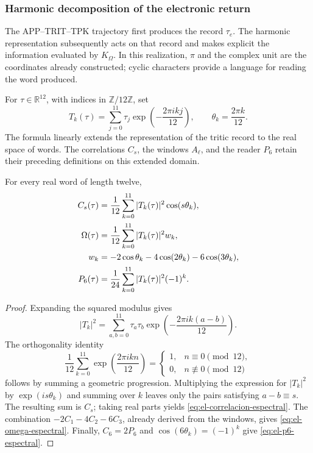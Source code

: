 \subsubsection{Harmonic decomposition of the electronic return}
\label{sec:el-espectro-retorno}

The APP--TRIT--TPK trajectory first produces the record
\(\tau_e\). The harmonic representation subsequently acts on that
record and makes explicit the information evaluated by \(K_\Omega\).
In this realization, \(\pi\) and the complex unit are the
coordinates already constructed; cyclic characters provide a
language for reading the word produced.

For \(\tau\in\mathbb R^{12}\), with indices in
\(\mathbb Z/12\mathbb Z\), set
\begin{equation}
 T_k(\tau)=\sum_{j=0}^{11}\tau_j
             \exp\!\left(-\frac{2\pi i kj}{12}\right),\qquad
 \theta_k=\frac{2\pi k}{12}.
 \label{eq:el-transformada-finita}
\end{equation}
The formula linearly extends the representation of the tritic
record to the real space of words. The correlations \(C_s\),
the windows \(A_\ell\), and the reader \(P_6\) retain their
preceding definitions on this extended domain.

\begin{theorem}
\label{thm:el-lector-espectral}
For every real word of length twelve,
\begin{align}
 C_s(\tau)&=\frac1{12}\sum_{k=0}^{11}|T_k(\tau)|^2
                         \cos(s\theta_k),
 \label{eq:el-correlacion-espectral}\\
 \Omega(\tau)&=\frac1{12}\sum_{k=0}^{11}|T_k(\tau)|^2w_k,
 \label{eq:el-omega-espectral}\\
 w_k&=-2\cos\theta_k-4\cos(2\theta_k)-6\cos(3\theta_k),\notag\\
 P_6(\tau)&=\frac1{24}\sum_{k=0}^{11}|T_k(\tau)|^2(-1)^k.
 \label{eq:el-p6-espectral}
\end{align}
\end{theorem}
\begin{proof}
Expanding the squared modulus gives
\[
 |T_k|^2=\sum_{a,b=0}^{11}\tau_a\tau_b
           \exp\!\left(-\frac{2\pi i k(a-b)}{12}\right).
\]
The orthogonality identity
\[
 \frac1{12}\sum_{k=0}^{11}
       \exp\!\left(\frac{2\pi i k n}{12}\right)
 =\begin{cases}1,&n\equiv0\pmod{12},\\0,&n\not\equiv0\pmod{12}
   \end{cases}
\]
follows by summing a geometric progression. Multiplying the
expression for \(|T_k|^2\) by \(\exp(is\theta_k)\) and summing over
\(k\) leaves only the pairs satisfying \(a-b\equiv s\).
The resulting sum is \(C_s\); taking real parts yields
\eqref{eq:el-correlacion-espectral}. The combination
\(-2C_1-4C_2-6C_3\), already derived from the windows, gives
\eqref{eq:el-omega-espectral}. Finally,
\(C_6=2P_6\) and \(\cos(6\theta_k)=(-1)^k\) give
\eqref{eq:el-p6-espectral}.
\end{proof}

